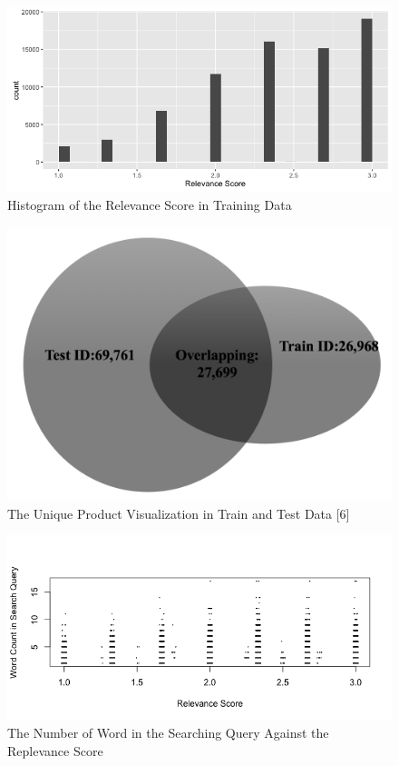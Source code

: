 \documentclass[11pt, titlepage]{article}
\begin{document}
\begin{figure}[H]
  \includegraphics[width=\linewidth]{relevance_score.png}
  \caption{Histogram of the Relevance Score in Training Data}
  \label{fig:boat1}
\end{figure}

\begin{figure}[H]
  \includegraphics[scale=0.7]{train_test_data.png}
  \caption{The Unique Product Visualization in Train and Test Data [6]}
  \label{fig:boat1}
\end{figure}

\begin{figure}[H]
  \includegraphics[width=\linewidth]{query_count.png}
  \caption{The Number of Word in the Searching Query Against the Replevance Score}
  \label{fig:boat1}
\end{figure}
\end{document}
